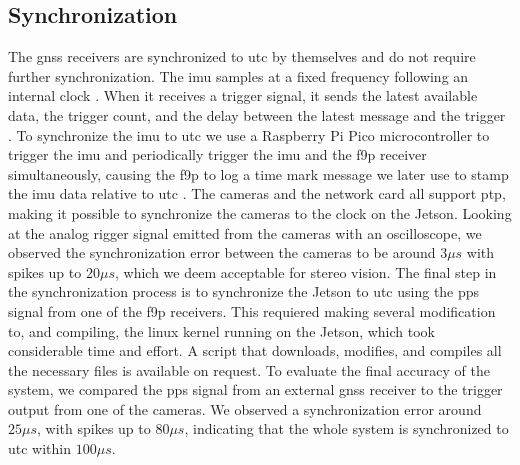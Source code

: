 \subsection{Synchronization}
The \gls{gnss} receivers are synchronized to \gls{utc} by themselves and do not require further synchronization.
The \gls{imu} samples at a fixed frequency following an internal clock \cite{safranSTIM300Datasheet}.
When it receives a trigger signal, it sends the latest available data, the trigger count, and the delay between the latest message and the trigger \cite{safranSTIM300Datasheet}.
To synchronize the \gls{imu} to \gls{utc} we use a Raspberry Pi Pico microcontroller to trigger the \gls{imu} and periodically trigger the \gls{imu} and the \gls{f9p} receiver simultaneously, causing the \gls{f9p} to log a time mark message we later use to stamp the \gls{imu} data relative to \gls{utc} \cite[190]{u-bloxZEDF9PInterfaceDescription}.
The cameras and the network card all support \gls{ptp}, making it possible to synchronize the cameras to the clock on the Jetson.
Looking at the analog rigger signal emitted from the cameras with an oscilloscope, we observed the synchronization error between the cameras to be around $3\mu s$ with spikes up to $20\mu s$, which we deem acceptable for stereo vision.
The final step in the synchronization process is to synchronize the Jetson to \gls{utc} using the \gls{pps} signal from one of the \gls{f9p} receivers.
This requiered making several modification to, and compiling, the linux kernel running on the Jetson, which took considerable time and effort.
A script that downloads, modifies, and compiles all the necessary files is available on request.
To evaluate the final accuracy of the system, we compared the \gls{pps} signal from an external \gls{gnss} receiver to the trigger output from one of the cameras. 
We observed a synchronization error around $25\mu s$, with spikes up to $80\mu s$, indicating that the whole system is synchronized to \gls{utc} within $100\mu s$.







